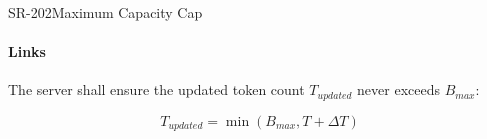 \begin{softwarerequirement}{SR-202}{Maximum Capacity Cap}
\paragraph{Links} 

The server shall ensure the updated token count $T_{updated}$ never exceeds $B_{max}$:

\begin{equation}
    T_{updated} = \min(B_{max}, T + \Delta T)
    \label{eq:maximum-capacity-cap}
\end{equation}
\end{softwarerequirement}